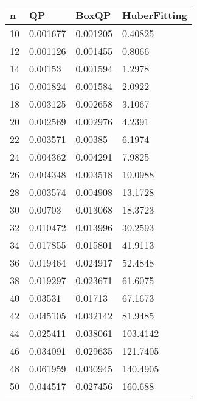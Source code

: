 \begin{tabular}{llll}
n & QP & BoxQP & HuberFitting \\ 
\hline 
10 & 0.001677 & 0.001205 & 0.40825 \\ 
12 & 0.001126 & 0.001455 & 0.8066 \\ 
14 & 0.00153 & 0.001594 & 1.2978 \\ 
16 & 0.001824 & 0.001584 & 2.0922 \\ 
18 & 0.003125 & 0.002658 & 3.1067 \\ 
20 & 0.002569 & 0.002976 & 4.2391 \\ 
22 & 0.003571 & 0.00385 & 6.1974 \\ 
24 & 0.004362 & 0.004291 & 7.9825 \\ 
26 & 0.004348 & 0.003518 & 10.0988 \\ 
28 & 0.003574 & 0.004908 & 13.1728 \\ 
30 & 0.00703 & 0.013068 & 18.3723 \\ 
32 & 0.010472 & 0.013996 & 30.2593 \\ 
34 & 0.017855 & 0.015801 & 41.9113 \\ 
36 & 0.019464 & 0.024917 & 52.4848 \\ 
38 & 0.019297 & 0.023671 & 61.6075 \\ 
40 & 0.03531 & 0.01713 & 67.1673 \\ 
42 & 0.045105 & 0.032142 & 81.9485 \\ 
44 & 0.025411 & 0.038061 & 103.4142 \\ 
46 & 0.034091 & 0.029635 & 121.7405 \\ 
48 & 0.061959 & 0.030945 & 140.4905 \\ 
50 & 0.044517 & 0.027456 & 160.688 \\ 
\hline 
\end{tabular}